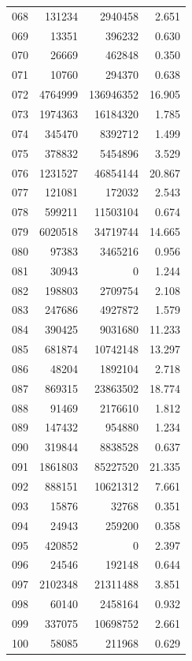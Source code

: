 \documentclass[anonymous,notoc]{gmcm2026}
\begin{document}
\begin{longtable}{lrrr}
068 & 131234 & 2940458 & 2.651 \\
069 & 13351 & 396232 & 0.630 \\
070 & 26669 & 462848 & 0.350 \\
071 & 10760 & 294370 & 0.638 \\
072 & 4764999 & 136946352 & 16.905 \\
073 & 1974363 & 16184320 & 1.785 \\
074 & 345470 & 8392712 & 1.499 \\
075 & 378832 & 5454896 & 3.529 \\
076 & 1231527 & 46854144 & 20.867 \\
077 & 121081 & 172032 & 2.543 \\
078 & 599211 & 11503104 & 0.674 \\
079 & 6020518 & 34719744 & 14.665 \\
080 & 97383 & 3465216 & 0.956 \\
081 & 30943 & 0 & 1.244 \\
082 & 198803 & 2709754 & 2.108 \\
083 & 247686 & 4927872 & 1.579 \\
084 & 390425 & 9031680 & 11.233 \\
085 & 681874 & 10742148 & 13.297 \\
086 & 48204 & 1892104 & 2.718 \\
087 & 869315 & 23863502 & 18.774 \\
088 & 91469 & 2176610 & 1.812 \\
089 & 147432 & 954880 & 1.234 \\
090 & 319844 & 8838528 & 0.637 \\
091 & 1861803 & 85227520 & 21.335 \\
092 & 888151 & 10621312 & 7.661 \\
093 & 15876 & 32768 & 0.351 \\
094 & 24943 & 259200 & 0.358 \\
095 & 420852 & 0 & 2.397 \\
096 & 24546 & 192148 & 0.644 \\
097 & 2102348 & 21311488 & 3.851 \\
098 & 60140 & 2458164 & 0.932 \\
099 & 337075 & 10698752 & 2.661 \\
100 & 58085 & 211968 & 0.629 \\
\end{longtable}
\end{document}
